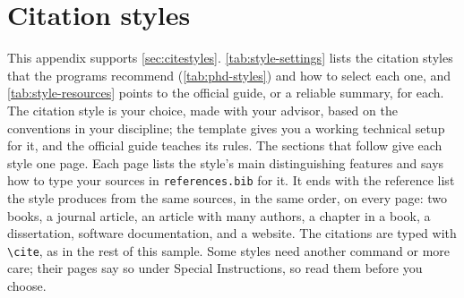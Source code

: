 %

\newcommand{\stylesample}[2]{%
  \IfFileExists{citation-styles/style-#2.pdf}
    {}
    {\section{#1}\label{sec:style-#2}%
     The sample page for this style is missing. Run \texttt{latexmk} in the
     \texttt{citation-styles} folder to build it.\clearpage}}

\chapter{Citation styles}
\label{app:citestyles}

This appendix supports \cref{sec:citestyles}. \cref{tab:style-settings} lists the citation styles that the programs recommend (\cref{tab:phd-styles}) and how to select each one, and \cref{tab:style-resources} points to the official guide, or a reliable summary, for each. The citation style is your choice, made with your advisor, based on the conventions in your discipline; the template gives you a working technical setup for it, and the official guide teaches its rules. The sections that follow give each style one page. Each page lists the style's main distinguishing features and says how to type your sources in \texttt{references.bib} for it. It ends with the reference list the style produces from the same sources, in the same order, on every page: two books, a journal article, an article with many authors, a chapter in a book, a dissertation, software documentation, and a website. The citations are typed with \verb+\cite+, as in the rest of this sample. Some styles need another command or more care; their pages say so under Special Instructions, so read them before you choose.

